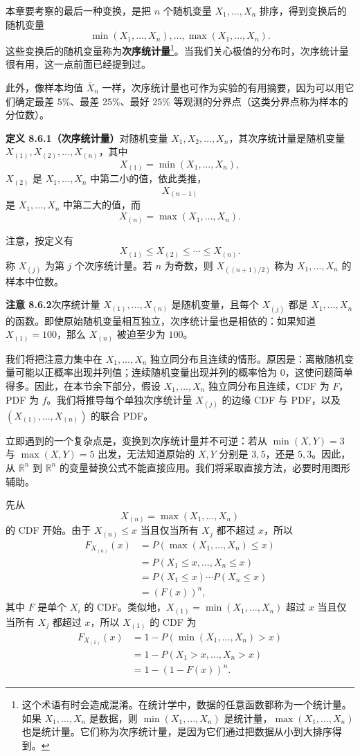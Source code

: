 \documentclass[UTF8,12pt,a4paper,fontset=fandol]{ctexart}
\begin{document}
本章要考察的最后一种变换，是把 $n$ 个随机变量 $X_1,\ldots,X_n$ 排序，得到变换后的随机变量
\[
  \min(X_1,\ldots,X_n),\ldots,\max(X_1,\ldots,X_n).
\]
这些变换后的随机变量称为\textbf{次序统计量}\footnote{这个术语有时会造成混淆。在统计学中，数据的任意函数都称为一个统计量。如果 $X_1,\ldots,X_n$ 是数据，则 $\min(X_1,\ldots,X_n)$ 是统计量，$\max(X_1,\ldots,X_n)$ 也是统计量。它们称为次序统计量，是因为它们通过把数据从小到大排序得到。}。当我们关心极值的分布时，次序统计量很有用，这一点前面已经提到过。

此外，像样本均值 $\bar X_n$ 一样，次序统计量也可作为实验的有用摘要，因为可以用它们确定最差 $5\%$、最差 $25\%$、最好 $25\%$ 等观测的分界点（这类分界点称为样本的分位数）。

\noindent\textbf{定义 8.6.1（次序统计量）}\quad 对随机变量 $X_1,X_2,\ldots,X_n$，其次序统计量是随机变量 $X_{(1)},X_{(2)},\ldots,X_{(n)}$，其中
\[
  X_{(1)}=\min(X_1,\ldots,X_n),
\]
$X_{(2)}$ 是 $X_1,\ldots,X_n$ 中第二小的值，依此类推，
\[
  X_{(n-1)}
\]
是 $X_1,\ldots,X_n$ 中第二大的值，而
\[
  X_{(n)}=\max(X_1,\ldots,X_n).
\]

注意，按定义有
\[
  X_{(1)}\le X_{(2)}\le\cdots\le X_{(n)}.
\]
称 $X_{(j)}$ 为第 $j$ 个次序统计量。若 $n$ 为奇数，则 $X_{((n+1)/2)}$ 称为 $X_1,\ldots,X_n$ 的样本中位数。

\noindent\textbf{注意 8.6.2}\quad 次序统计量 $X_{(1)},\ldots,X_{(n)}$ 是随机变量，且每个 $X_{(j)}$ 都是 $X_1,\ldots,X_n$ 的函数。即使原始随机变量相互独立，次序统计量也是相依的：如果知道 $X_{(1)}=100$，那么 $X_{(n)}$ 被迫至少为 $100$。

我们将把注意力集中在 $X_1,\ldots,X_n$ 独立同分布且连续的情形。原因是：离散随机变量可能以正概率出现并列值；连续随机变量出现并列的概率恰为 $0$，这使问题简单得多。因此，在本节余下部分，假设 $X_1,\ldots,X_n$ 独立同分布且连续，CDF 为 $F$，PDF 为 $f$。我们将推导每个单独次序统计量 $X_{(j)}$ 的边缘 CDF 与 PDF，以及 $(X_{(1)},\ldots,X_{(n)})$ 的联合 PDF。

立即遇到的一个复杂点是，变换到次序统计量并不可逆：若从 $\min(X,Y)=3$ 与 $\max(X,Y)=5$ 出发，无法知道原始的 $X,Y$ 分别是 $3,5$，还是 $5,3$。因此，从 $\mathbb R^n$ 到 $\mathbb R^n$ 的变量替换公式不能直接应用。我们将采取直接方法，必要时用图形辅助。

先从
\[
  X_{(n)}=\max(X_1,\ldots,X_n)
\]
的 CDF 开始。由于 $X_{(n)}\le x$ 当且仅当所有 $X_j$ 都不超过 $x$，所以
\[
\begin{aligned}
  F_{X_{(n)}}(x)
  &=P(\max(X_1,\ldots,X_n)\le x)\\
  &=P(X_1\le x,\ldots,X_n\le x)\\
  &=P(X_1\le x)\cdots P(X_n\le x)\\
  &=(F(x))^n,
\end{aligned}
\]
其中 $F$ 是单个 $X_i$ 的 CDF。类似地，$X_{(1)}=\min(X_1,\ldots,X_n)$ 超过 $x$ 当且仅当所有 $X_j$ 都超过 $x$，所以 $X_{(1)}$ 的 CDF 为
\[
\begin{aligned}
  F_{X_{(1)}}(x)
  &=1-P(\min(X_1,\ldots,X_n)>x)\\
  &=1-P(X_1>x,\ldots,X_n>x)\\
  &=1-(1-F(x))^n.
\end{aligned}
\]
\end{document}
